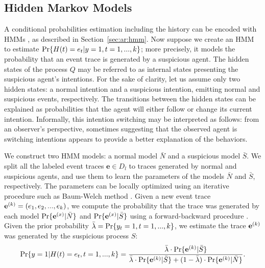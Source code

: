 \subsection{Hidden Markov Models}
\noindent
{}
A conditional probabilities estimation including the history can be encoded with HMMs \citep{Rabiner1989}, as described in Section~\ref{sec:ar:hmm}. 
%
Now suppose we create an HMM to estimate $\text{Pr}\{H(t)=e_t|y=1, t=1,...,k\}$; more precisely, it models the probability that an event trace is generated by a suspicious agent. The hidden states of the process $Q$ may be referred to as internal states presenting the suspicious agent's intentions. For the sake of clarity, let us assume only two hidden states: a normal intention and a suspicious intention, emitting normal and suspicious events, respectively. The transitions between the hidden states can be explained as probabilities that the agent will either follow or change its current intention. 
Informally, this intention switching  may be interpreted as follows: from an observer's perspective, sometimes suggesting that the observed agent is switching intentions appears to provide a better explanation of the behaviors.


We construct two HMM models: a normal model $\bar{N}$ and a suspicious model $\bar{S}$. We split all the labeled event traces $\mathbf{e} \in D_l$ to traces generated by normal and suspicious agents, and use them to learn the parameters of the models $\bar{N}$ and $\bar{S}$, respectively. The parameters can be locally optimized using an iterative procedure such as Baum-Welch method \citep{Rabiner1989}.
%
Given a new event trace $\mathbf{e}^{\scriptsize(k)}=(e_1, e_2, ..., e_k)$, we compute the probability that the trace was generated by each model $\text{Pr}\{\mathbf{e}^{\scriptsize(x)}|\bar{N}\}$ and $\text{Pr}\{\mathbf{e}^{\scriptsize(x)}|\bar{S}\}$ using a forward-backward procedure \citep{Rabiner1989}. Given the prior probability $\bar{\lambda}=\text{Pr}\{y_t=1, t=1,...,k\}$, we estimate the trace $\mathbf{e}^{\scriptsize(k)}$ was generated by the suspicious process $S$:
\begin{eqnarray}
\label{eq:hmms}
    \text{Pr}\{y=1|H(t)=e_t, t=1, ..., k\} = \frac{\bar{\lambda} \cdot \text{Pr}\{\mathbf{e}^{\scriptsize(k)}|\bar{S}\}}{\bar{\lambda} \cdot \text{Pr}\{\mathbf{e}^{\scriptsize(k)}|\bar{S}\} + (1-\bar{\lambda}) \cdot \text{Pr}\{\mathbf{e}^{\scriptsize(k)}|\bar{N}\}}. 
\end{eqnarray}

